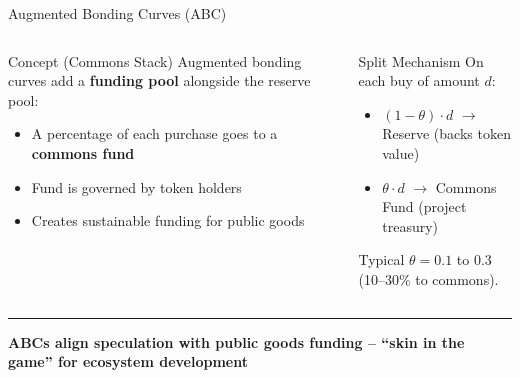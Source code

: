 \documentclass[8pt,aspectratio=169]{beamer}
\newcommand{\bottomnote}[1]{\vfill\vspace{-2mm}\textcolor{mllavender2}{\rule{\textwidth}{0.4pt}}\vspace{1mm}\footnotesize\textbf{#1}}
\begin{document}
\begin{frame}{Augmented Bonding Curves (ABC)}
\begin{columns}[T]
\begin{block}{Concept (Commons Stack)}
\footnotesize
Augmented bonding curves add a \textbf{funding pool} alongside the reserve pool:
\begin{itemize}
  \item A percentage of each purchase goes to a \textbf{commons fund}
  \item Fund is governed by token holders
  \item Creates sustainable funding for public goods
\end{itemize}
\end{block}
\vspace{2mm}
\begin{block}{Split Mechanism}
\footnotesize
On each buy of amount $d$:
\begin{itemize}
  \item $(1 - \theta) \cdot d$ $\rightarrow$ Reserve (backs token value)
  \item $\theta \cdot d$ $\rightarrow$ Commons Fund (project treasury)
\end{itemize}
Typical $\theta = 0.1$ to $0.3$ (10--30\% to commons).
\end{block}

\end{columns}
\bottomnote{ABCs align speculation with public goods funding -- ``skin in the game'' for ecosystem development}
\end{frame}
\end{document}
